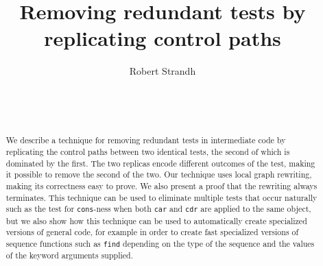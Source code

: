 \documentclass{sig-alternate-05-2015}
\def\inputtex#1{}
\begin{document}
\title{Removing redundant tests by replicating control paths}
\author{\alignauthor
Robert Strandh\\
\\
\\
\\
}

\maketitle

\begin{abstract}
We describe a technique for removing redundant tests in intermediate
code by replicating the control paths between two identical tests, the
second of which is dominated by the first.  The two replicas encode
different outcomes of the test, making it possible to remove the
second of the two.  Our technique uses local graph rewriting, making
its correctness easy to prove.  We also present a proof that the
rewriting always terminates.  This technique can be used to eliminate
multiple tests that occur naturally such as the test for
\texttt{cons}-ness when both \texttt{car} and \texttt{cdr} are applied
to the same object, but we also show how this technique can be used to
automatically create specialized versions of general code, for example
in order to create fast specialized versions of sequence functions
such as \texttt{find} depending on the type of the sequence and the
values of the keyword arguments supplied.
\end{abstract}





\inputtex{sec-introduction.tex}
\inputtex{sec-previous.tex}
\inputtex{sec-our-method.tex}
\inputtex{sec-conclusions.tex}



\end{document}
